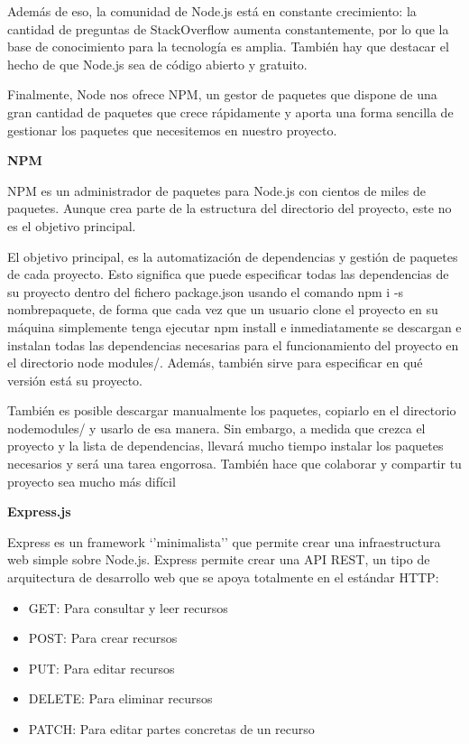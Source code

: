 Además de eso, la comunidad de Node.js está en constante crecimiento: la cantidad de preguntas de StackOverflow aumenta constantemente, por lo que la base de conocimiento para la tecnología es amplia. También hay que destacar el hecho de que Node.js sea de código abierto y gratuito. 

Finalmente, Node nos ofrece NPM, un gestor de paquetes que dispone de una gran cantidad de paquetes que crece rápidamente y aporta una forma sencilla de gestionar los paquetes que necesitemos en nuestro proyecto.

{\bf NPM}

NPM es un administrador de paquetes para Node.js con cientos de miles de paquetes. Aunque crea parte de la estructura del directorio del proyecto, este no es el objetivo principal.

El objetivo principal, es la automatización de dependencias y gestión de paquetes de cada proyecto. Esto significa que puede especificar todas las dependencias de su proyecto dentro del fichero package.json usando el comando npm i -s nombrepaquete, de forma que cada vez que un usuario clone el proyecto en su máquina simplemente tenga ejecutar npm install e inmediatamente se descargan e instalan todas las dependencias necesarias para el funcionamiento del proyecto en el directorio node modules/. Además, también sirve para especificar en qué versión está su proyecto.

También es posible descargar manualmente los paquetes, copiarlo en el directorio nodemodules/ y usarlo de esa manera. Sin embargo, a medida que crezca el proyecto y la lista de dependencias, llevará mucho tiempo instalar los paquetes necesarios y será una tarea engorrosa. También hace que colaborar y compartir tu proyecto sea mucho más difícil

{\bf Express.js}

Express es un framework ‘’minimalista’’ que permite crear una infraestructura web simple sobre Node.js. Express permite crear una API REST, un tipo de arquitectura de desarrollo web que se apoya totalmente en el estándar HTTP:

\begin{itemize}
  \item GET: Para consultar y leer recursos
  \item POST: Para crear recursos
  \item PUT: Para editar recursos
  \item DELETE: Para eliminar recursos
  \item PATCH: Para editar partes concretas de un recurso
\end{itemize}

